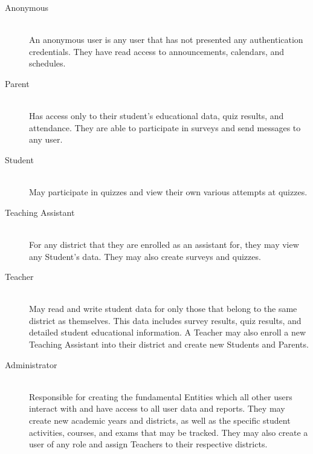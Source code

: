 \documentclass[letterpaper,12pt]{report}
\begin{document}
\begin{description}
	\item [Anonymous] \hfill \\ An anonymous user is any user that has not presented any authentication credentials. They have read access to announcements, calendars, and schedules.
	\item [Parent] \hfill \\ Has access only to their student's educational data, quiz results, and attendance. They are able to participate in surveys and send messages to any user.
	\item [Student] \hfill \\ May participate in quizzes and view their own various attempts at quizzes.
	\item [Teaching Assistant] \hfill \\ For any district that they are enrolled as an assistant for, they may view any Student's data. They may also create surveys and quizzes.
	\item [Teacher] \hfill \\ May read and write student data for only those that belong to the same district as themselves. This data includes survey results, quiz results, and detailed student educational information. A Teacher may also enroll a new Teaching Assistant into their district and  create new Students and Parents.
	\item [Administrator] \hfill \\ Responsible for creating the fundamental Entities which all other users interact with and have access to all user data and reports. They may create new academic years and districts, as well as the specific student activities, courses, and exams that may be tracked. They may also create a user of any role and assign Teachers to their respective districts.


\end{description}
\end{document}
